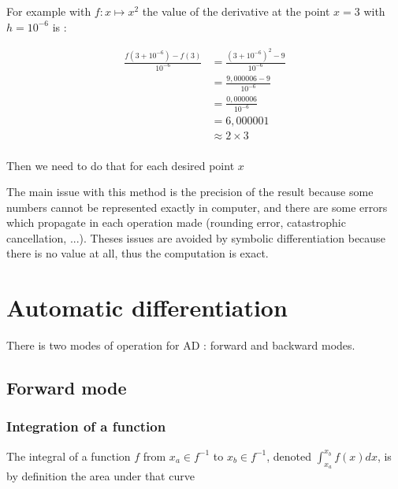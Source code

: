 \documentclass[12pt]{article}
\begin{document}
For example with $f: x \mapsto x^2$ the value of the derivative at the point $x=3$ with $h=10^{-6}$ is :

\begin{equation*}
    \begin{split}
        \frac{f(3+10^{-6})-f(3)}{10^{-6}} &= \frac{(3+10^{-6})^2 - 9}{10^{-6}}\\
            &= \frac{9,000006 - 9}{10^{-6}}\\
            &= \frac{0,000006}{10^{-6}}\\
            &= 6,000001 \\
            &\approx 2 \times 3 \\
    \end{split}
\end{equation*}

Then we need to do that for each desired point $x$

The main issue with this method is the precision of the result because some numbers cannot \cite{stackexchange_how_many_numbers_in_computer} be represented exactly in computer, and there are some errors \cite{web_floatin_point_errors} which propagate in each operation made (rounding error, catastrophic cancellation, ...).
Theses issues are avoided by symbolic differentiation because there is no value at all, thus the computation is exact.


%
%

\section{Automatic differentiation}

There is two modes of operation for AD : forward and backward modes.

\subsection{Forward mode}

\subsubsection{Integration of a function}

The integral of a function $f$ from $x_a \in f^{-1}$ to $x_b \in f^{-1}$, denoted $\int_{x_a}^{x_b} f(x)dx$, is by definition the area under that curve 
\end{document}
